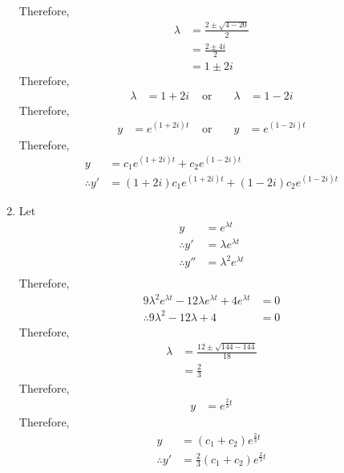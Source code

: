 \documentclass[fleqn, a4paper, 11pt, oneside]{amsart}
\theoremstyle{definition}
\theoremstyle{theorem}
\begin{document}
\begin{solution}
\begin{enumerate}[leftmargin = *]
\begin{align*}
			\end{align*}
			Therefore,
			\begin{align*}
				\lambda & = \frac{2 \pm \sqrt{4 - 20}}{2} \\
                                        & = \frac{2 \pm 4 i}{2}           \\
                                        & = 1 \pm 2 i
			\end{align*}
			Therefore,
			\begin{align*}
				\lambda & = 1 + 2 i & \text{ or } &  & \lambda & = 1 - 2 i
			\end{align*}
			Therefore,
			\begin{align*}
				y & = e^{(1 + 2 i) t} & \text{ or } &  & y & = e^{(1 - 2 i) t}
			\end{align*}
			Therefore,
			\begin{align*}
				y &= c_1 e^{(1 + 2 i) t} + c_2 e^{(1 - 2 i) t}\\
				\therefore y' &= (1 + 2 i) c_1 e^{(1 + 2 i) t} + (1 - 2 i) c_2 e^{(1 - 2 i) t}
			\end{align*}
		\item
			Let
			\begin{align*}
				y              & = e^{\lambda t}           \\
				\therefore y'  & = \lambda e^{\lambda t}   \\
				\therefore y'' & = \lambda^2 e^{\lambda t} \\
			\end{align*}
			Therefore,
			\begin{align*}
				9 \lambda^2 e^{\lambda t} - 12 \lambda e^{\lambda t} + 4 e^{\lambda t} & = 0 \\
				\therefore 9 \lambda^2 - 12 \lambda + 4                                & = 0
			\end{align*}
			Therefore,
			\begin{align*}
				\lambda & = \frac{12 \pm \sqrt{144 - 144}}{18} \\
                                        & = \frac{2}{3}
			\end{align*}
			Therefore,
			\begin{align*}
				y & = e^{\frac{2}{3} t}
			\end{align*}
			Therefore,
			\begin{align*}
				y &= (c_1 + c_2) e^{\frac{2}{3} t}\\
				\therefore y' &= \frac{2}{3} (c_1 + c_2) e^{\frac{2}{3} t}
			\end{align*}

\end{enumerate}
\end{solution}
\end{document}
